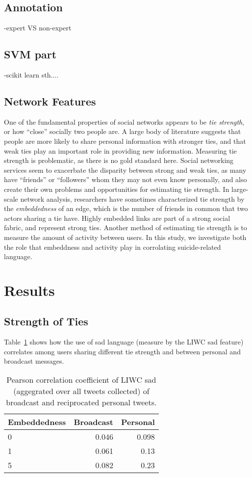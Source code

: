 \documentclass[11pt]{article}
\begin{document}
\subsection{Annotation}
-expert VS non-expert


\subsection{SVM part}
-scikit learn sth....

\subsection{Network Features}
One of the fundamental properties of social networks appears to be \emph{tie strength}, or how ``close'' socially two people are. A large body of literature suggests that people are more likely to share personal information with stronger ties, and that weak ties play an important role in providing new information.  
Measuring tie strength is problematic, as there is no gold standard here. Social networking services seem to exacerbate the disparity between strong and weak ties, as many have ``friends'' or ``followers'' whom they may not even know personally, and also create their own problems and opportunities for estimating tie strength. In large-scale network analysis, researchers have sometimes characterized tie strength by the 
\emph{embeddedness} of an edge, which is the number of friends in common that two actors sharing a tie have. Highly embedded links are part of a strong social fabric, and represent strong ties. Another method of estimating tie strength is to measure the amount of activity between users. In this study, we investigate both the role that embeddness and activity play in corrolating suicide-related language. 

\section{Results}
\subsection{Strength of Ties}
Table~\ref{tab:strength} shows how the use of sad language (measure by the LIWC sad feature) correlates among users sharing different tie strength and between personal and broadcast messages.

\begin{table}
  \centering
  \begin{tabular}{l|r|r}
Embeddedness    &Broadcast&Personal\\
\hline
0 & 0.046 & 0.098\\
\hline
1 & 0.061 & 0.13\\
\hline
5& 0.082 & 0.23
  \end{tabular}
\label{tab:strength}
\caption{Pearson correlation coefficient of LIWC sad (aggegrated over all tweets collected) of broadcast and reciprocated personal tweets.}
\end{table}
\end{document}

